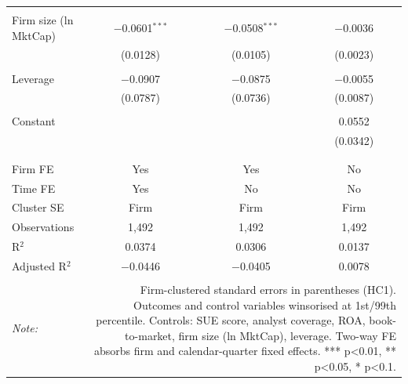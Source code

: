 \begin{table}[!htbp]
\begin{tabular}{@{\extracolsep{5pt}}lccc}
  & & & \\ 
 Firm size (ln MktCap) & $-$0.0601$^{***}$ & $-$0.0508$^{***}$ & $-$0.0036 \\ 
  & (0.0128) & (0.0105) & (0.0023) \\ 
  & & & \\ 
 Leverage & $-$0.0907 & $-$0.0875 & $-$0.0055 \\ 
  & (0.0787) & (0.0736) & (0.0087) \\ 
  & & & \\ 
 Constant &  &  & 0.0552 \\ 
  &  &  & (0.0342) \\ 
  & & & \\ 
\hline \\[-1.8ex] 
Firm FE & Yes & Yes & No \\ 
Time FE & Yes & No & No \\ 
Cluster SE & Firm & Firm & Firm \\ 
Observations & 1,492 & 1,492 & 1,492 \\ 
R$^{2}$ & 0.0374 & 0.0306 & 0.0137 \\ 
Adjusted R$^{2}$ & $-$0.0446 & $-$0.0405 & 0.0078 \\ 
\hline 
\hline \\[-1.8ex] 
\textit{Note:}  & \multicolumn{3}{r}{Firm-clustered standard errors in parentheses (HC1). Outcomes and control variables winsorised at 1st/99th percentile. Controls: SUE score, analyst coverage, ROA, book-to-market, firm size (ln MktCap), leverage. Two-way FE absorbs firm and calendar-quarter fixed effects. *** p<0.01, ** p<0.05, * p<0.1.} \\ 
\end{tabular} 
\end{table} 
